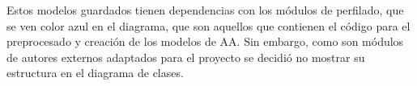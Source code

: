 Estos modelos guardados tienen dependencias con los módulos de perfilado, que se ven color azul en el diagrama, que son aquellos que contienen el código para el preprocesado y creación de los modelos de AA. Sin embargo, como son módulos de autores externos adaptados para el proyecto se decidió no mostrar su estructura en el diagrama de clases.

